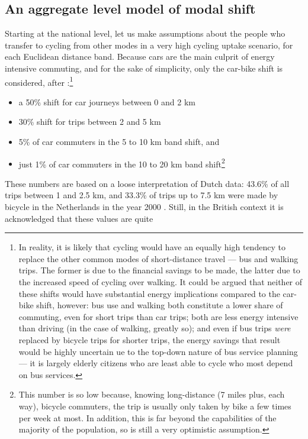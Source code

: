 \subsection{An aggregate level model of modal shift}
Starting at the national level, let us make assumptions about the people who
transfer to cycling from other modes in a very high cycling uptake scenario,
for each Euclidean distance band. Because cars are the main culprit of energy
intensive commuting, and for the sake of simplicity, only the car-bike shift is
considered, after \citet{Lovelace2011-assessing}:\footnote{In
reality, it is likely that cycling
would have an equally high tendency to replace the other common modes of
short-distance travel --- bus
\citet{dorling2013population} and walking trips. The former is due to the
financial savings to be made, the latter due to the increased speed of cycling
over walking. It could be argued that neither of these shifts would have
substantial energy implications compared to the car-bike shift, however: bus
use and walking both constitute a lower share of commuting, even for short
trips than car trips; both are less energy intensive than driving (in the case
of walking, greatly so); and even if bus trips \emph{were} replaced by bicycle
trips for shorter trips, the energy savings that result would be highly
uncertain ue to the top-down nature of bus service planning --- it is largely
elderly citizens who are least able to cycle who most depend on bus services.
}
\begin{itemize} 
 \item a 50\% shift for car journeys between 0 and 2 km
 \item 30\% shift for trips between 2 and 5 km
 \item 5\% of car commuters in the 5 to 10 km band shift, and
 \item just 1\% of car commuters in the 10 to 20 km band
 shift\footnote{This
 number is so low because, knowing long-distance (7 miles plus, each way),
 bicycle commuters, the trip is usually only taken by bike a few times per week
at most. In addition, this is far beyond the capabilities of the majority of
the population, so is still a very optimistic assumption.
}
\end{itemize}
These numbers are based on a loose interpretation of Dutch data: 43.6\% of
all trips between
1 and 2.5 km, and 33.3\% of trips up to 7.5 km were made by bicycle in the
Netherlands in the year 2000 \citep{Rietveld2004}.
Still, in the British context it is acknowledged that these values are quite
